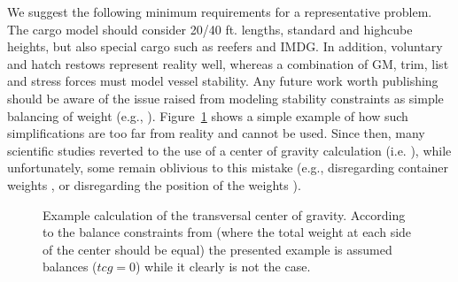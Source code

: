 \documentclass[preprint,12pt,authoryear]{elsarticle}
\begin{document}
We suggest the following minimum requirements for a representative problem. The cargo model should consider 20/40 ft. lengths, standard and highcube heights, but also special cargo such as reefers and IMDG. In addition, voluntary and hatch restows represent reality well, whereas a combination of GM, trim, list and stress forces must model vessel stability. Any future work worth publishing should be aware of the issue raised from modeling stability constraints as simple balancing of weight (e.g., \cite{Ambrosino2004StowingProblem}). 
Figure~\ref{fig:CG_error} shows a simple example of how such simplifications are too far from reality and cannot be used. Since then, many scientific studies reverted to the use of a center of gravity calculation (i.e. \cite{Ambrosino2015APlanning, Pacino2011FastVessels, Christensen2017AStowage, Zhu2020IntegerProblem}), while unfortunately, some remain oblivious to this mistake (e.g., disregarding container weights \cite{Azevedo2014SolvingMeta-heuristics, Azevedo2018SolvingAlgorithm}, or disregarding the position of the weights \cite{Li2018Multi-PortUncertainties,Li2020OptimizingShipping,Cruz-Reyes2015,Kebedow2019IncludingProblem}).
\begin{figure}[h]
    \centering


    \caption{Example calculation of the transversal center of gravity. According to the balance constraints from \cite{Ambrosino2004StowingProblem} (where the total weight at each side of the center should be equal) the presented example is assumed balances ($tcg=0$) while it clearly is not the case.}
    \label{fig:CG_error}
\end{figure}
\end{document}
